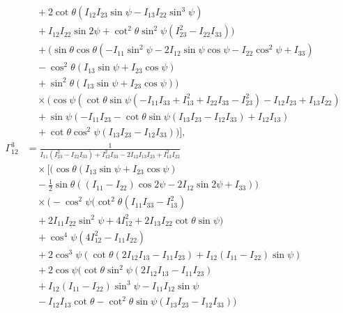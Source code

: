 \documentclass[pdflatex,sn-mathphys-num]{sn-jnl}%
\theoremstyle{thmstyleone}%
\theoremstyle{thmstyletwo}%
\theoremstyle{thmstylethree}%
\begin{document}
\begin{appendices}
\begin{align}
    &\quad +2 \cot \theta \left(I_{12} I_{23} \sin \psi-I_{13} I_{22} \sin ^3\psi\right) \nonumber \\
    &\quad +I_{12} I_{22} \sin 2\psi+\cot ^2\theta \sin ^2\psi \left(I_{23}^2-I_{22} I_{33}\right)\bigg) \nonumber \\
    &\quad +\bigg(\sin \theta \cos \theta \left(-I_{11} \sin ^2\psi-2 I_{12} \sin \psi \cos \psi-I_{22} \cos ^2\psi+I_{33}\right) \nonumber \\
    &\quad -\cos ^2\theta (I_{13} \sin \psi+I_{23} \cos \psi) \nonumber \\
    &\quad +\sin ^2\theta (I_{13} \sin \psi+I_{23} \cos \psi)\bigg) \nonumber \\
    &\quad \times \bigg(\cos \psi \left(\cot \theta \sin \psi \left(-I_{11} I_{33}+I_{13}^2+I_{22} I_{33}-I_{23}^2\right)-I_{12} I_{23}+I_{13} I_{22}\right) \nonumber \\
    &\quad +\sin \psi (-I_{11} I_{23}-\cot \theta \sin \psi (I_{13} I_{23}-I_{12} I_{33})+I_{12} I_{13}) \nonumber \\
    &\quad +\cot \theta \cos ^2\psi (I_{13} I_{23}-I_{12} I_{33})\bigg) \bigg], \nonumber \\
    \Gamma^{3}_{12} &= \frac{1}{I_{11} \left(I_{23}^2-I_{22} I_{33}\right)+I_{12}^2 I_{33}-2 I_{12} I_{13} I_{23}+I_{13}^2 I_{22}} \nonumber \\
    &\quad \times \bigg[ \bigg(\cos \theta (I_{13} \sin \psi+I_{23} \cos \psi) \nonumber \\
    &\quad -\frac{1}{2} \sin \theta ((I_{11}-I_{22}) \cos 2\psi-2 I_{12} \sin 2\psi+I_{33})\bigg) \nonumber \\
    &\quad \times \bigg(-\cos ^2\psi \Big(\cot ^2\theta \left(I_{11} I_{33}-I_{13}^2\right) \nonumber \\
    &\quad +2 I_{11} I_{22} \sin ^2\psi+4 I_{12}^2+2 I_{13} I_{22} \cot \theta \sin \psi\Big) \nonumber \\
    &\quad +\cos ^4\psi \left(4 I_{12}^2-I_{11} I_{22}\right) \nonumber \\
    &\quad +2 \cos ^3\psi (\cot \theta (2 I_{12} I_{13}-I_{11} I_{23})+I_{12} (I_{11}-I_{22}) \sin \psi) \nonumber \\
    &\quad +2 \cos \psi \Big(\cot \theta \sin ^2\psi (2 I_{12} I_{13}-I_{11} I_{23}) \nonumber \\
    &\quad +I_{12} (I_{11}-I_{22}) \sin ^3\psi -I_{11} I_{12} \sin \psi \nonumber \\
    &\quad -I_{12} I_{13} \cot \theta-\cot ^2\theta \sin \psi (I_{13} I_{23}-I_{12} I_{33})\Big) \nonumber \\

\end{align}
\end{appendices}
\end{document}
